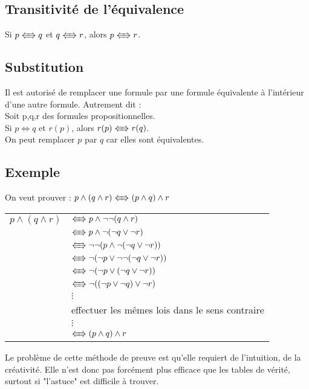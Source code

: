 			\subsection*{Transitivité de l'équivalence}
			\indent Si $p \LRarrow q$ et $q \LRarrow r$, alors $p \LRarrow r$.
			\subsection*{Substitution}
			Il est autorisé de remplacer une formule par une formule équivalente à l’intérieur d’une autre formule. Autrement dit : \\
			\indent Soit p,q,r des formules propositionnelles.\\
			\indent Si $p \Leftrightarrow q$ et $r(p)$, alors $r(p) \LRarrow r(q)$.\\
			On peut remplacer $p$ par $q$ car elles sont équivalentes.


			\subsection*{Exemple}
			On veut prouver : $p \land (q \land r) \LRarrow (p \land q) \land r$
			\begin{center}
			\begin{tabular}{ll}

			$p \land (q \land r)$ & $\LRarrow p \land \lnot \lnot (q \land r)$\\
			& $\LRarrow p \land \lnot (\lnot q \lor \lnot r)$\\
			& $\LRarrow \lnot \lnot (p \land \lnot (\lnot q \lor \lnot r))$\\
			& $\LRarrow \lnot (\lnot p \lor \lnot \lnot (\lnot q \lor \lnot r))$\\
			& $\LRarrow \lnot (\lnot p \lor (\lnot q \lor \lnot r))$\\
			& $\LRarrow \lnot ((\lnot p \lor \lnot q) \lor \lnot r)$\\
			&$\vdots$\\
			& effectuer les mêmes lois dans le sens contraire \\
			&$\vdots$\\
			& $\LRarrow (p \land q) \land r$\\
			\end{tabular}
			\end{center}
Le problème de cette méthode de preuve est qu'elle requiert de l'intuition, de la créativité. Elle n'est donc pas forcément plus efficace que les tables de vérité, surtout si "l'astuce" est difficile à trouver.
		

